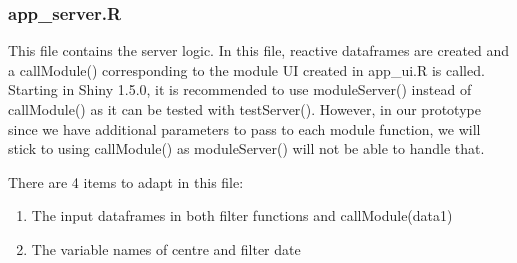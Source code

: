 \documentclass[]{article}
\providecommand{\tightlist}{%
  \setlength{\itemsep}{0pt}\setlength{\parskip}{0pt}}
\begin{document}
\hypertarget{app_server.r}{%
\subsubsection{app\_server.R}\label{app_server.r}}

This file contains the server logic. In this file, reactive dataframes
are created and a callModule() corresponding to the module UI created in
app\_ui.R is called. Starting in Shiny 1.5.0, it is recommended to use
moduleServer() instead of callModule() as it can be tested with
testServer(). However, in our prototype since we have additional
parameters to pass to each module function, we will stick to using
callModule() as moduleServer() will not be able to handle that.

There are 4 items to adapt in this file:

\begin{enumerate}
\def\labelenumi{\arabic{enumi}.}
\tightlist
\item
  The input dataframes in both filter functions and callModule(data1)
\item
  The variable names of centre and filter date
\end{enumerate}
\end{document}
